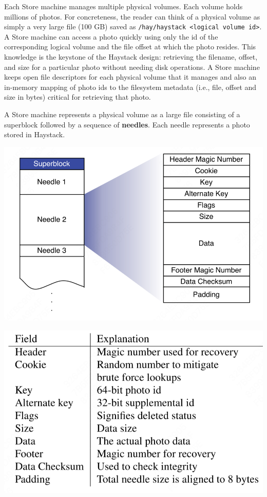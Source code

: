 \documentclass[11pt]{article}
\begin{document}
Each Store machine manages multiple physical volumes. Each volume holds millions of photos. For
concreteness, the reader can think of a physical volume as simply a very large file (100 GB) saved as
\texttt{/hay/haystack <logical volume id>}. A Store machine can access a photo quickly using only the id of the
corresponding logical volume and the file offset at which the photo resides. This knowledge is the
keystone of the Haystack design: retrieving the filename, offset, and size for a particular photo
without needing disk operations. A Store machine keeps open file descriptors for each physical volume
that it manages and also an in-memory mapping of photo ids to the filesystem metadata (i.e., file,
offset and size in bytes) critical for retrieving that photo.

A Store machine represents a physical volume as a large file consisting of a superblock followed by a
sequence of \textbf{needles}. Each needle represents a photo stored in Haystack.

\begin{center}
\includegraphics[width=.8\textwidth]{../../images/papers/136.png}
\end{center}

\begin{center}
\includegraphics[width=.8\textwidth]{../../images/papers/137.png}
\end{center}
\end{document}
